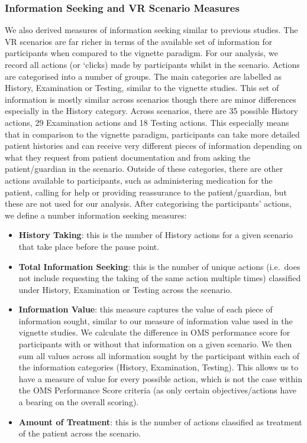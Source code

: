 \documentclass[a4paper, nobind]{templates/ociamthesis}
\providecommand{\tightlist}{%
  \setlength{\itemsep}{0pt}\setlength{\parskip}{0pt}}
\begin{document}
\subsubsection{Information Seeking and VR Scenario Measures}\label{information-seeking-and-vr-scenario-measures}

We also derived measures of information seeking similar to previous studies. The VR scenarios are far richer in terms of the available set of information for participants when compared to the vignette paradigm. For our analysis, we record all actions (or `clicks) made by participants whilst in the scenario. Actions are categorised into a number of groups. The main categories are labelled as History, Examination or Testing, similar to the vignette studies. This set of information is mostly similar across scenarios though there are minor differences especially in the History category. Across scenarios, there are 35 possible History actions, 29 Examination actions and 18 Testing actions. This especially means that in comparison to the vignette paradigm, participants can take more detailed patient histories and can receive very different pieces of information depending on what they request from patient documentation and from asking the patient/guardian in the scenario. Outside of these categories, there are other actions available to participants, such as administering medication for the patient, calling for help or providing reassurance to the patient/guardian, but these are not used for our analysis. After categorising the participants' actions, we define a number information seeking measures:

\begin{itemize}
\tightlist
\item
  \textbf{History Taking}: this is the number of History actions for a given scenario that take place before the pause point.
\item
  \textbf{Total Information Seeking}: this is the number of unique actions (i.e.~does not include requesting the taking of the same action multiple times) classified under History, Examination or Testing across the scenario.
\item
  \textbf{Information Value}: this measure captures the value of each piece of information sought, similar to our measure of information value used in the vignette studies. We calculate the difference in OMS performance score for participants with or without that information on a given scenario. We then sum all values across all information sought by the participant within each of the information categories (History, Examination, Testing). This allows us to have a measure of value for every possible action, which is not the case within the OMS Performance Score criteria (as only certain objectives/actions have a bearing on the overall scoring).
\item
  \textbf{Amount of Treatment}: this is the number of actions classified as treatment of the patient across the scenario.
\end{itemize}
\end{document}
